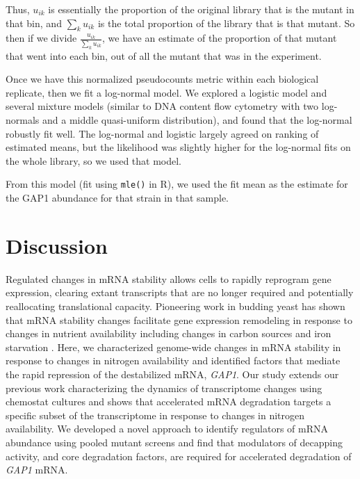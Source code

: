Thus, \(u_{ik}\) is essentially the proportion of the
original library that is the mutant in that bin, and 
\(\sum_k u_{ik}\) is the total proportion of the library that is
that mutant.
So then if we divide \(\frac{u_{ik}}{\sum_k u_{ik}}\),
we have an estimate of the proportion of that mutant that
went into each bin, out of all the mutant that was in the experiment.

Once we have this normalized pseudocounts metric within each biological
replicate, then we fit a log-normal model. We explored a logistic model
and several mixture models (similar to DNA content flow cytometry with
two log-normals and a middle quasi-uniform distribution), and found that
the log-normal robustly fit well. The log-normal and logistic largely
agreed on ranking of estimated means, but the likelihood was slightly
higher for the log-normal fits on the whole library, so we used that
model.

From this model (fit using \texttt{mle()} in R), we used the fit 
mean as the estimate for the GAP1 abundance for that strain in that
sample.

\section{Discussion}

Regulated changes in mRNA stability allows cells to rapidly reprogram
gene expression, clearing extant transcripts that are no longer
required and potentially reallocating translational capacity.
Pioneering work in budding yeast has shown that mRNA
stability changes facilitate gene expression remodeling in response to
changes in nutrient availability including changes in carbon sources
\parencite{scheffler1998control} and iron starvation
\parencite{puig2005coordinated}. 
Here, we characterized genome-wide changes
in mRNA stability in response to changes in nitrogen availability and
identified factors that mediate the rapid repression of the
destabilized mRNA, \textit{GAP1}. Our study extends our previous work
characterizing the dynamics of transcriptome changes using chemostat
cultures \parencite{airoldi2016steady} and shows that accelerated mRNA
degradation targets a specific subset of the transcriptome in response
to changes in nitrogen availability. We developed a novel approach to
identify regulators of mRNA abundance using pooled mutant screens and
find that modulators of decapping activity, and core degradation
factors, are required for accelerated degradation of 
\textit{GAP1} mRNA. 
 
